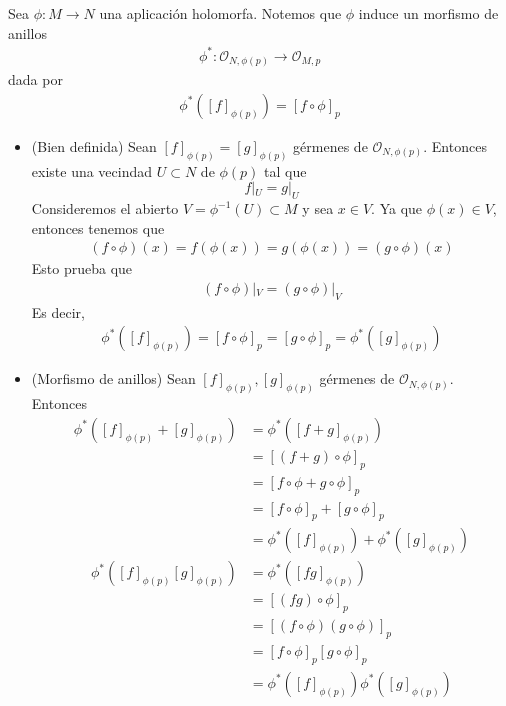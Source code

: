 \iffalse
\begin{remark}
	Sea $\phi:M\to N$ una aplicación holomorfa. Notemos que $\phi$ induce un morfismo de anillos
	\begin{align*}
		\phi^*:\mathscr{O}_{N,\phi(p)}\longrightarrow \mathscr{O}_{M,p}
	\end{align*}
	dada por
	\begin{align*}
		\phi^*([f]_{\phi(p)})=[f\circ \phi]_p
	\end{align*}
	\begin{center}
	\end{center}
	\begin{itemize}
		\item (Bien definida) Sean $[f]_{\phi(p)}=[g]_{\phi(p)}$ gérmenes de $\mathscr{O}_{N,\phi(p)}$. Entonces existe una vecindad $U\subset N$ de $\phi(p)$ tal que
		\begin{equation*}
			f|_U=g|_U
		\end{equation*}
		Consideremos el abierto $V=\phi^{-1}(U)\subset M$ y sea $x\in V$. Ya que $\phi(x)\in V$, entonces tenemos que
		\begin{align*}
			(f\circ \phi)(x)=f(\phi(x))=g(\phi(x))=(g\circ \phi)(x)
		\end{align*}
		Esto prueba que 
		\begin{align*}
			(f\circ \phi)|_V=(g\circ \phi)|_V
		\end{align*} 
		Es decir,
		\begin{align*}
			\phi^*([f]_{\phi(p)})=[f\circ \phi]_p=[g\circ \phi]_p=\phi^*([g]_{\phi(p)})
		\end{align*}
		
		\item (Morfismo de anillos) Sean $[f]_{\phi(p)},[g]_{\phi(p)}$ gérmenes de $\mathscr{O}_{N,\phi(p)}$. Entonces
		\begin{align*}
			\phi^*([f]_{\phi(p)}+[g]_{\phi(p)})&=	\phi^*([f+g]_{\phi(p)})\\
			&=[(f+g)\circ \phi]_p\\
			&=[f\circ \phi+ g\circ \phi]_p\\
			&=[f\circ \phi]_p+[g\circ \phi]_p\\
			&=\phi^*([f]_{\phi(p)})+\phi^*([g]_{\phi(p)})
		\end{align*}
		\begin{align*}
			\phi^*([f]_{\phi(p)}[g]_{\phi(p)})&=		\phi^*([fg]_{\phi(p)})\\
			&=[(fg)\circ \phi]_p\\
			&=[(f\circ \phi) (g\circ \phi)]_p\\
			&=[f\circ \phi]_p[g\circ \phi]_p\\
			&=\phi^*([f]_{\phi(p)})\phi^*([g]_{\phi(p)})
		\end{align*}
	\end{itemize}
\end{remark}
